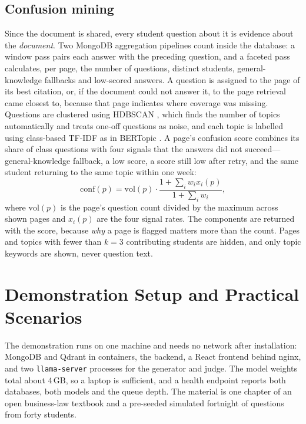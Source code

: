 \documentclass[conference]{IEEEtran}
\begin{document}
\subsection{Confusion mining}
\label{sec:mining}

Since the document is shared, every student question about it is evidence about the \emph{document}. Two
MongoDB aggregation pipelines count inside the database: a window pass pairs each answer with the
preceding question, and a faceted pass calculates, per page, the number of questions, distinct students,
general-knowledge fallbacks and low-scored answers. A question is assigned to the page of its best
citation, or, if the document could not answer it, to the page retrieval came closest to, because that
page indicates where coverage was missing. Questions are clustered using HDBSCAN
\cite{campello2013hdbscan}, which finds the number of topics automatically and treats one-off questions
as noise, and each topic is labelled using class-based TF-IDF as in BERTopic
\cite{grootendorst2022bertopic}. A page's confusion score combines its share of class questions with
four signals that the answers did not succeed---general-knowledge fallback, a low score, a score still
low after retry, and the same student returning to the same topic within one week:
\begin{equation}
\mathrm{conf}(p) = \mathrm{vol}(p)\cdot\frac{1+\sum_i w_i x_i(p)}{1+\sum_i w_i},
\label{eq:conf}
\end{equation}
where $\mathrm{vol}(p)$ is the page's question count divided by the maximum across shown pages and $x_i(p)$
are the four signal rates. The components are returned with the score, because \emph{why} a page is flagged
matters more than the count. Pages and topics with fewer than $k{=}3$ contributing students are hidden, and
only topic keywords are shown, never question text.

\section{Demonstration Setup and Practical Scenarios}


The demonstration runs on one machine and needs no network after installation: MongoDB and Qdrant in
containers, the backend, a React frontend behind nginx, and two \texttt{llama-server} processes for the
generator and judge. The model weights total about 4\,GB, so a laptop is sufficient, and a health endpoint
reports both databases, both models and the queue depth. The material is one chapter of an open business-law
textbook \cite{valbrune2019bizlaw} and a pre-seeded simulated fortnight of questions from forty students.
\end{document}
